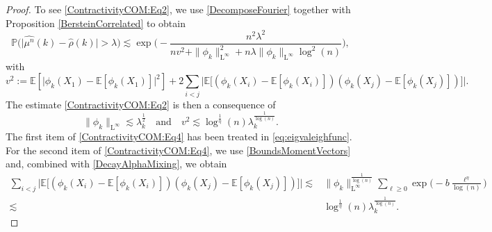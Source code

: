 \documentclass[11pt,a4paper,oneside]{amsart}
\numberwithin{equation}{section}
\newcommand{\LL}{\mathrm{L}}
\begin{document}
\begin{proof}
To see \eqref{ContractivityCOM:Eq2}, we use \eqref{DecomposeFourier} together with Proposition \ref{BersteinCorrelated} to obtain
%
$$\mathbb{P}\big(\vert\widehat{\mu^n}(k)-\widehat{\rho}(k)\vert>\lambda\big)\lesssim \exp\Big(-\frac{n^2\lambda^2}{nv^2+\|\phi_k\|^2_{\LL^{\infty}}+n\lambda\|\phi_k\|_{\LL^{\infty}}\log^2(n)}\Big),$$
%
with 
%
\begin{equation}\label{vsquaredContra}
%
v^2:=\mathbb{E}[\vert\phi_k(X_1)-\mathbb{E}[\phi_k(X_1)]\vert^2]+2\sum_{i<j}\big\vert\mathbb{E}\big[(\phi_k(X_i)-\mathbb{E}[\phi_k(X_i)])(\phi_k(X_j)-\mathbb{E}[\phi_k(X_j)])\big]\big\vert.
%
\end{equation}
%
The estimate \eqref{ContractivityCOM:Eq2} is then a consequence of 
%
\begin{equation}\label{ContractivityCOM:Eq4}
%
 \|\phi_k\|_{\LL^{\infty}}\lesssim \lambda^{\frac{1}{2}}_k\quad\text{and}\quad v^2\lesssim \log^{\frac{1}{\eta}}(n)\lambda^{\frac{1}{\log(n)}}_k.
%
\end{equation}
%
The first item of \eqref{ContractivityCOM:Eq4} has been treated in \eqref{eq:eigvaleighfunc}. 
%
%
%
%
For the second item of \eqref{ContractivityCOM:Eq4}, we use \eqref{BoundsMomentVectors} and, combined with \eqref{DecayAlphaMixing}, we obtain
%
\begin{align*}
%
\sum_{i<j}\big\vert\mathbb{E}\big[(\phi_k(X_i)-\mathbb{E}[\phi_k(X_i)])(\phi_k(X_j)-\mathbb{E}[\phi_k(X_j)])\big]\big\vert\lesssim& \|\phi_k\|^{\frac{1}{\log(n)}}_{\LL^\infty}\sum_{\ell\geq 0}\exp\big(-b\tfrac{\ell^{\eta}}{\log(n)}\big)\\
\lesssim& \log^{\frac{1}{\eta}}(n)\lambda^{\frac{1}{\log(n)}}_k.
%
\end{align*}
%
%
%
%
%
%
% 



\end{proof}
\end{document}
